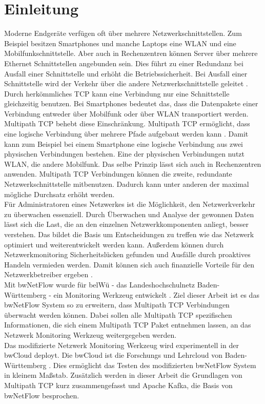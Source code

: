 \documentclass[a4paper, 12pt]{article}
\begin{document}
\maketitle

\section{Einleitung}
Moderne Endgeräte verfügen oft über mehrere Netzwerkschnittstellen. Zum Beispiel besitzen Smartphones und manche Laptops eine WLAN und eine Mobilfunkschnittstelle.
Aber auch in Rechenzentren können Server über mehrere Ethernet Schnittstellen angebunden sein. Dies führt zu einer Redundanz bei Ausfall einer Schnittstelle und erhöht die Betriebssicherheit. Bei Ausfall einer Schnittstelle wird der Verkehr über die andere Netzwerkschnittstelle geleitet \cite{gill2011understanding}. 
Durch herkömmliches TCP kann eine Verbindung nur eine Schnittstelle gleichzeitig benutzen. Bei Smartphones bedeutet das, dass die Datenpakete einer Verbindung entweder über Mobilfunk oder über WLAN transportiert werden.
Multipath TCP behebt diese Einschränkung. Multipath TCP ermöglicht, dass eine logische Verbindung über mehrere Pfade aufgebaut werden kann \cite{ford2013rfc}.
Damit kann zum Beispiel bei einem Smartphone eine logische Verbindung aus zwei physischen Verbindungen bestehen. Eine der physischen Verbindungen nutzt WLAN, die andere Mobilfunk. Das selbe Prinzip lässt sich auch in Rechenzentren anwenden. 
Multipath TCP Verbindungen können die zweite, redundante Netzwerkschnittstelle mitbenutzen.
Dadurch kann unter anderen der maximal mögliche Durchsatz erhöht werden.
\\
Für Administratoren eines Netzwerkes ist die Möglichkeit, den Netzwerkverkehr zu überwachen essenziell.
Durch Überwachen und Analyse der gewonnen Daten lässt sich die Last, die an den einzelnen Netzwerkkomponenten anliegt, besser verstehen. 
Das bildet die Basis um Entscheidungen zu treffen wie das Netzwerk optimiert und weiterentwickelt werden kann.
Außerdem können durch Netzwerkmonitoring Sicherheitslücken gefunden und Ausfälle durch proaktives Handeln vermieden werden.
Damit können sich auch finanzielle Vorteile für den Netzwerkbetreiber ergeben \cite{lee2014network}. 
\\
Mit bwNetFlow wurde für belWü - das Landeshochschulnetz Baden-\\Württemberg - ein Monitoring Werkzeug entwickelt \cite{nagele2019bwnetflow}.
Ziel dieser Arbeit ist es das bwNetFlow System so zu erweitern, dass Multipath TCP Verbindungen überwacht werden können.
Dabei sollen alle Multipath TCP spezifischen Informationen, die sich einem Multipath TCP Paket entnehmen lassen, an das Netzwerk Monitoring Werkzeug weitergegeben werden.
\\
Das modifizierte Netzwerk Monitoring Werkzeug wird experimentell in der bwCloud deployt.
Die bwCloud ist die Forschungs und Lehrcloud von Baden-Württemberg \cite{bwcloud}.
Dies ermöglicht das Testen des modifizierten bwNetFlow System in kleinem Maßstab.
Zusätzlich werden in dieser Arbeit die Grundlagen von Multipath TCP kurz zusammengefasst und Apache Kafka, die Basis von bwNetFlow besprochen.
\end{document}
